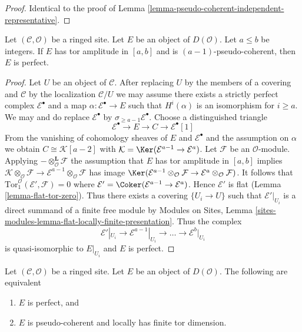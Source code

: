 \begin{proof}
Identical to the proof of
Lemma \ref{lemma-pseudo-coherent-independent-representative}.
\end{proof}

\begin{lemma}
\label{lemma-perfect-precise}
Let $(\mathcal{C}, \mathcal{O})$ be a ringed site.
Let $E$ be an object of $D(\mathcal{O})$.
Let $a \leq b$ be integers. If $E$ has tor amplitude in $[a, b]$
and is $(a - 1)$-pseudo-coherent, then $E$ is perfect.
\end{lemma}

\begin{proof}
Let $U$ be an object of $\mathcal{C}$. After replacing $U$ by the members
of a covering and $\mathcal{C}$ by the localization $\mathcal{C}/U$
we may assume there exists a strictly perfect complex $\mathcal{E}^\bullet$
and a map $\alpha : \mathcal{E}^\bullet \to E$ such that $H^i(\alpha)$ is
an isomorphism for $i \geq a$. We may and do replace
$\mathcal{E}^\bullet$ by $\sigma_{\geq a - 1}\mathcal{E}^\bullet$. Choose a
distinguished triangle
$$
\mathcal{E}^\bullet \to E \to C \to \mathcal{E}^\bullet[1]
$$
From the vanishing of cohomology sheaves of $E$ and $\mathcal{E}^\bullet$
and the assumption on $\alpha$ we obtain $C \cong \mathcal{K}[a - 2]$ with
$\mathcal{K} = \Ker(\mathcal{E}^{a - 1} \to \mathcal{E}^a)$.
Let $\mathcal{F}$ be an $\mathcal{O}$-module.
Applying $- \otimes_\mathcal{O}^\mathbf{L} \mathcal{F}$
the assumption that $E$ has tor amplitude in $[a, b]$
implies $\mathcal{K} \otimes_\mathcal{O} \mathcal{F} \to
\mathcal{E}^{a - 1} \otimes_\mathcal{O} \mathcal{F}$ has image
$\Ker(\mathcal{E}^{a - 1} \otimes_\mathcal{O} \mathcal{F}
\to \mathcal{E}^a \otimes_\mathcal{O} \mathcal{F})$.
It follows that $\text{Tor}_1^\mathcal{O}(\mathcal{E}', \mathcal{F}) = 0$
where $\mathcal{E}' = \Coker(\mathcal{E}^{a - 1} \to \mathcal{E}^a)$.
Hence $\mathcal{E}'$ is flat (Lemma \ref{lemma-flat-tor-zero}).
Thus there exists a covering $\{U_i \to U\}$ such that
$\mathcal{E}'|_{U_i}$ is a direct summand of a finite free module by
Modules on Sites, Lemma
\ref{sites-modules-lemma-flat-locally-finite-presentation}.
Thus the complex
$$
\mathcal{E}'|_{U_i} \to \mathcal{E}^{a - 1}|_{U_i} \to \ldots \to
\mathcal{E}^b|_{U_i}
$$
is quasi-isomorphic to $E|_{U_i}$ and $E$ is perfect.
\end{proof}

\begin{lemma}
\label{lemma-perfect}
Let $(\mathcal{C}, \mathcal{O})$ be a ringed site.
Let $E$ be an object of $D(\mathcal{O})$.
The following are equivalent
\begin{enumerate}
\item $E$ is perfect, and
\item $E$ is pseudo-coherent and locally has finite tor dimension.
\end{enumerate}
\end{lemma}

